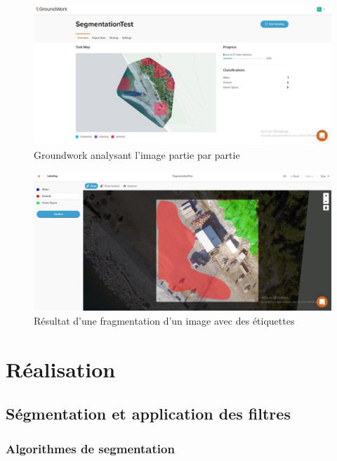 \documentclass[12pt, openany]{report}
\begin{document}
\begin{figure}[h]
\centering
\includegraphics[scale=0.4]{groundwork_screen1.jpg}
\caption{Groundwork analysant l'image partie par partie}
\end{figure}

\begin{figure}[h]
\centering
\includegraphics[scale=0.4]{groundwork_screen2.jpg}
\caption{Résultat d'une fragmentation d'un image avec des étiquettes}
\end{figure}


\part{Réalisation}

\chapter{Ségmentation et application des filtres}

\section{Algorithmes de segmentation}
\end{document}
